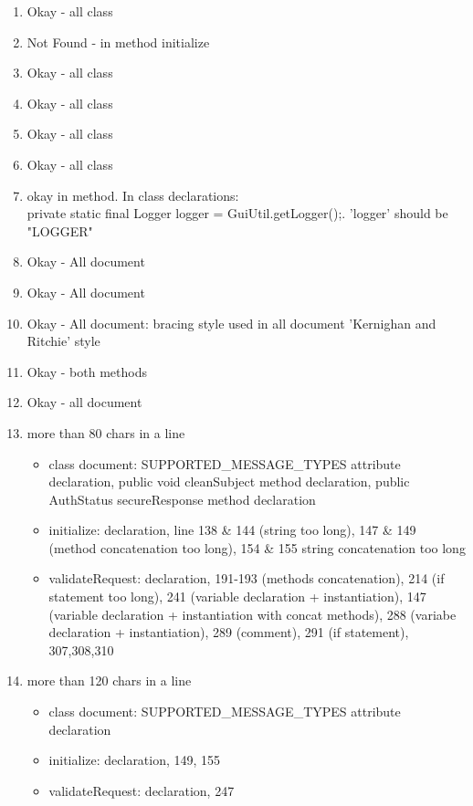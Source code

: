  \begin{enumerate}
        \item Okay - all class
        \item Not Found - in method initialize
        \item Okay - all class
        \item Okay - all class
        \item Okay - all class
        \item Okay - all class
        \item okay in method.
            In class declarations: \\private static final Logger logger = GuiUtil.getLogger();. 'logger' should be "LOGGER"
        \item Okay - All document
        \item Okay - All document
        \item Okay - All document: bracing style used in all document 'Kernighan and Ritchie' style
        \item Okay - both methods
        \item Okay - all document
        \item   more than 80 chars in a line
                \begin{itemize}
                    \item class document: SUPPORTED\_MESSAGE\_TYPES attribute declaration, public void cleanSubject method declaration, public AuthStatus secureResponse method declaration
                    \item initialize: declaration, line 138 \& 144 (string too long), 147 \& 149 (method concatenation too long), 154 \& 155 string concatenation too long
                    \item validateRequest: declaration, 191-193 (methods concatenation), 214 (if statement too long), 241 (variable declaration + instantiation), 147 (variable declaration + instantiation with concat methods), 288 (variabe declaration + instantiation), 289 (comment), 291 (if statement), 307,308,310
                \end{itemize}
        \item   more than 120 chars in a line
                \begin{itemize}
                    \item class document: SUPPORTED\_MESSAGE\_TYPES attribute declaration
                    \item initialize: declaration, 149, 155
                    \item validateRequest: declaration, 247

\end{itemize}
\end{enumerate}
